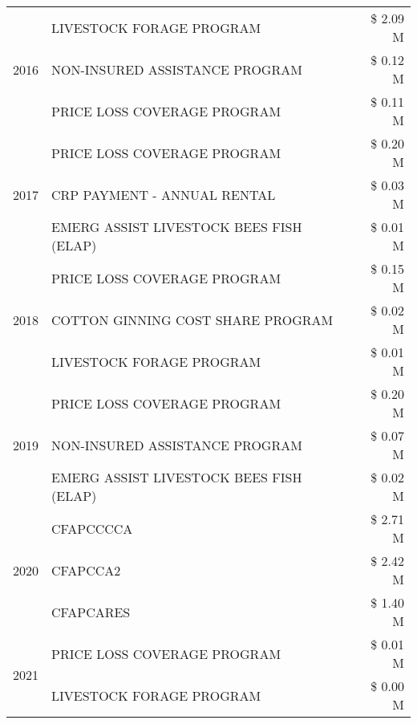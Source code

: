 \begin{tabular}{llr}
\cline{1-3}
\multirow[t]{3}{*}{2016} & LIVESTOCK FORAGE PROGRAM & \$ 2.09 M \\
 & NON-INSURED ASSISTANCE PROGRAM & \$ 0.12 M \\
 & PRICE LOSS COVERAGE PROGRAM & \$ 0.11 M \\
\cline{1-3}
\multirow[t]{3}{*}{2017} & PRICE LOSS COVERAGE PROGRAM & \$ 0.20 M \\
 & CRP PAYMENT - ANNUAL RENTAL & \$ 0.03 M \\
 & EMERG ASSIST LIVESTOCK BEES FISH (ELAP) & \$ 0.01 M \\
\cline{1-3}
\multirow[t]{3}{*}{2018} & PRICE LOSS COVERAGE PROGRAM & \$ 0.15 M \\
 & COTTON GINNING COST SHARE PROGRAM & \$ 0.02 M \\
 & LIVESTOCK FORAGE PROGRAM & \$ 0.01 M \\
\cline{1-3}
\multirow[t]{3}{*}{2019} & PRICE LOSS COVERAGE PROGRAM & \$ 0.20 M \\
 & NON-INSURED ASSISTANCE PROGRAM & \$ 0.07 M \\
 & EMERG ASSIST LIVESTOCK BEES FISH (ELAP) & \$ 0.02 M \\
\cline{1-3}
\multirow[t]{3}{*}{2020} & CFAPCCCCA & \$ 2.71 M \\
 & CFAPCCA2 & \$ 2.42 M \\
 & CFAPCARES & \$ 1.40 M \\
\cline{1-3}
\multirow[t]{2}{*}{2021} & PRICE LOSS COVERAGE PROGRAM & \$ 0.01 M \\
 & LIVESTOCK FORAGE PROGRAM & \$ 0.00 M \\
\cline{1-3}
\bottomrule
\end{tabular}
